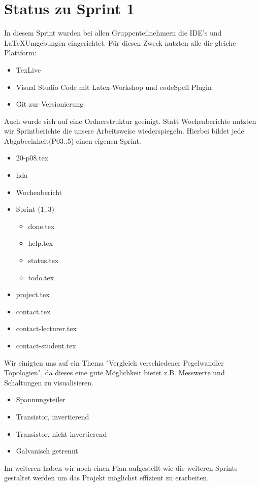 \section{Status zu Sprint 1
}\label{sec:status}

In diesem Sprint wurden bei allen Gruppenteilnehmern die IDE's und \LaTeX Umgebungen eingerichtet.
Für diesen Zweck nutzten alle die gleiche Plattform:
\begin{itemize}
  \item TexLive
  \item Visual Studio Code mit Latex-Workshop und codeSpell Plugin
  \item Git zur Versionierung
\end{itemize}
Auch wurde sich auf eine Ordnerstruktur geeinigt. Statt Wochenberichte nutzten wir Sprintberichte die unsere Arbeitsweise wiederspiegeln.
Hierbei bildet jede Abgabeeinheit(P03..5) einen eigenen Sprint.
\begin{itemize}
  \item 20-p08.tex
  \item hda
  \item Wochenbericht
  \item Sprint (1..3)
  \begin{itemize}
    \item done.tex
    \item help.tex
    \item status.tex
    \item todo.tex
  \end{itemize}
  \item project.tex
  \item contact.tex
  \item contact-lecturer.tex
  \item contact-student.tex
\end{itemize}
Wir einigten uns auf ein Thema "Vergleich verschiedener Pegelwandler Topologien", da dieses eine gute Möglichkeit bietet z.B. Messwerte und Schaltungen zu visualisieren.
\begin{itemize}
  \item Spannungsteiler
  \item Transistor, invertierend
  \item Transistor, nicht invertierend
  \item Galvanisch getrennt
\end{itemize}
Im weiteren haben wir noch einen Plan aufgestellt wie die weiteren Sprints gestaltet werden um das Projekt möglichst effizient zu erarbeiten.

